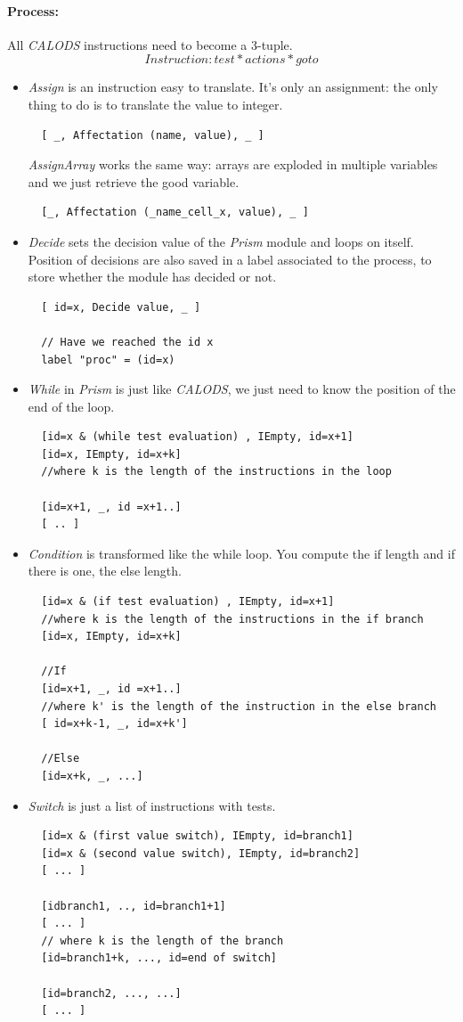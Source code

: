 \documentclass{article}
\begin{document}
\paragraph{Process:}
All \textit{CALODS} instructions need to become a 3-tuple.
$$ Instruction: { test * actions * goto } $$
\begin{itemize}
  \item{\textit{Assign} is an instruction easy to translate. It's only an assignment: the only thing to do is to translate the value to integer.
  \begin{lstlisting}
  [ _, Affectation (name, value), _ ]
  \end{lstlisting}
  \textit{AssignArray} works the same way: arrays are exploded in multiple variables and we just retrieve the good variable.
  \begin{lstlisting}
  [_, Affectation (_name_cell_x, value), _ ]
  \end{lstlisting}
  }
  \item{\textit{Decide} sets the decision value of the \textit{Prism} module and loops on itself. Position of decisions are also saved in a label associated to the process, to store whether the module has decided or not.
  \begin{lstlisting}
  [ id=x, Decide value, _ ]
  
  // Have we reached the id x 
  label "proc" = (id=x)
  \end{lstlisting}
  }
  \item{\textit{While} in \textit{Prism} is just like \textit{CALODS}, we just need to know the position of the end of the loop.
  \begin{lstlisting}
  [id=x & (while test evaluation) , IEmpty, id=x+1]
  [id=x, IEmpty, id=x+k] 
  //where k is the length of the instructions in the loop
  
  [id=x+1, _, id =x+1..]
  [ .. ] 
  \end{lstlisting}
  }
  \item{\textit{Condition} is transformed like the while loop. You compute the if length and if there is one, the else length.
  \begin{lstlisting}
  [id=x & (if test evaluation) , IEmpty, id=x+1]
  //where k is the length of the instructions in the if branch
  [id=x, IEmpty, id=x+k]
  
  //If
  [id=x+1, _, id =x+1..]
  //where k' is the length of the instruction in the else branch 
  [ id=x+k-1, _, id=x+k']
  
  //Else
  [id=x+k, _, ...]
  \end{lstlisting}
  }
  \item{\textit{Switch} is just a list of instructions with tests.
  \begin{lstlisting}
  [id=x & (first value switch), IEmpty, id=branch1]
  [id=x & (second value switch), IEmpty, id=branch2]
  [ ... ]
  
  [idbranch1, .., id=branch1+1]
  [ ... ]
  // where k is the length of the branch
  [id=branch1+k, ..., id=end of switch]
  
  [id=branch2, ..., ...]
  [ ... ]
  \end{lstlisting}
  }
\end{itemize}
\end{document}
